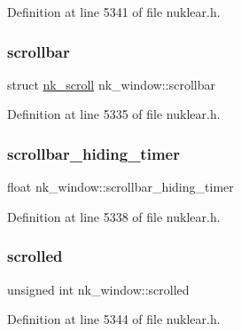 Definition at line 5341 of file nuklear.\+h.

\mbox{\label{structnk__window_a6a6e8fdf89a7039df725a14b640dc9df}} 
\subsubsection{\texorpdfstring{scrollbar}{scrollbar}}
{\footnotesize\ttfamily struct \mbox{\hyperlink{structnk__scroll}{nk\+\_\+scroll}} nk\+\_\+window\+::scrollbar}



Definition at line 5335 of file nuklear.\+h.

\mbox{\label{structnk__window_ae1edf68bb62484a80ef588d2ab0fd210}} 
\subsubsection{\texorpdfstring{scrollbar\+\_\+hiding\+\_\+timer}{scrollbar\_hiding\_timer}}
{\footnotesize\ttfamily float nk\+\_\+window\+::scrollbar\+\_\+hiding\+\_\+timer}



Definition at line 5338 of file nuklear.\+h.

\mbox{\label{structnk__window_ae08590387048eac30fbfde13579ca39a}} 
\subsubsection{\texorpdfstring{scrolled}{scrolled}}
{\footnotesize\ttfamily unsigned int nk\+\_\+window\+::scrolled}



Definition at line 5344 of file nuklear.\+h.

\mbox{\label{structnk__window_ac620283e47a5647e437a5f7742ac31bf}} 

